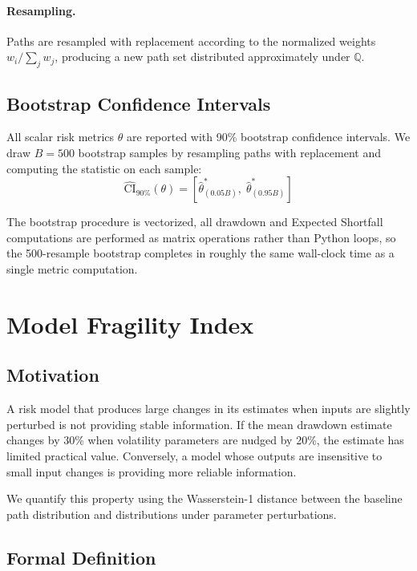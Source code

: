 \documentclass[12pt]{article}
\newcommand{\Q}{\mathbb{Q}}
\begin{document}
\paragraph{Resampling.}
Paths are resampled with replacement according to the normalized weights
$w_i / \sum_j w_j$, producing a new path set distributed approximately under $\Q$.

\subsection{Bootstrap Confidence Intervals}

All scalar risk metrics $\theta$ are reported with 90\% bootstrap confidence intervals.
We draw $B = 500$ bootstrap samples by resampling paths with replacement and computing
the statistic on each sample:
\begin{equation}
  \widehat{\text{CI}}_{90\%}(\theta) =
    \left[\hat\theta^*_{(0.05B)},\; \hat\theta^*_{(0.95B)}\right]
\end{equation}

The bootstrap procedure is vectorized, all drawdown and Expected Shortfall computations
are performed as matrix operations rather than Python loops, so the 500-resample
bootstrap completes in roughly the same wall-clock time as a single metric computation.


\section{Model Fragility Index}

\subsection{Motivation}

A risk model that produces large changes in its estimates when inputs are slightly
perturbed is not providing stable information. If the mean drawdown estimate changes
by 30\% when volatility parameters are nudged by 20\%, the estimate has limited
practical value. Conversely, a model whose outputs are insensitive to small input
changes is providing more reliable information.

We quantify this property using the Wasserstein-1 distance between the baseline path
distribution and distributions under parameter perturbations.

\subsection{Formal Definition}
\end{document}
